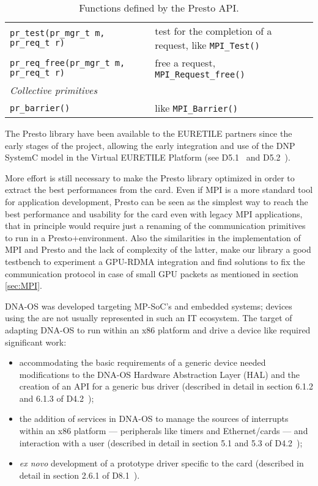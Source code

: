\begin{table}[!htb]
\begin{tabular}{|p{10cm}|p{8cm}|}
\texttt{pr\_test(pr\_mgr\_t \*m, pr\_req\_t r)} & test for the completion of a request, like \texttt{MPI\_Test()}\\
\texttt{pr\_req\_free(pr\_mgr\_t \*m, pr\_req\_t r)} & free a request, \texttt{MPI\_Request\_free()}\\
\hline
\hline
\multicolumn{2}{|l|}{\emph{Collective primitives}}\\
\hline
\texttt{pr\_barrier()} & like \texttt{MPI\_Barrier()}\\
\hline       
\end{tabular}
\caption{Functions defined by the Presto API.}
\label{tab:prestoapi}
\end{table}


The Presto library have been available to the EURETILE partners since
the early stages of the project, allowing the early integration and
use of the DNP SystemC model in the Virtual EURETILE Platform (see
D5.1~\cite{euretile:D5_1} and D5.2~\cite{euretile:D5_2}).

More effort is still necessary to make the Presto library optimized in
order to extract the best performances from the \apenetp card.  Even
if MPI is a more standard tool for application development, Presto can
be seen as the simplest way to reach the best performance and
usability for the \apenetp card even with legacy MPI applications,
that in principle would require just a renaming of the communication
primitives to run in a Presto+\apenetp environment. Also the
similarities in the implementation of MPI and Presto and the lack of
complexity of the latter, make our library a good testbench to
experiment a GPU-RDMA integration and find solutions to fix the
communication protocol in case of small GPU packets as mentioned in
section \ref{sec:MPI}.

DNA-OS was developed targeting
MP-SoC's and embedded systems; devices using the \PCIe are not usually
represented in such an IT ecosystem.
The target of adapting DNA-OS to run within an x86 platform and drive
a \PCIe device like \apenetp required significant work:
\begin{itemize}
\item accommodating the basic requirements of a generic \PCIe device
  needed modifications to the DNA-OS Hardware Abstraction Layer (HAL)
  and the creation of an API for a generic bus driver (described in
  detail in section 6.1.2 and 6.1.3 of D4.2~\cite{euretile:D4_2});
\item the addition of services in DNA-OS to manage the sources of
  interrupts within an x86 platform --- peripherals like timers and
  Ethernet/\apenetp cards --- and interaction with a user (described
  in detail in section 5.1 and 5.3 of D4.2~\cite{euretile:D4_2});
\item \textit{ex novo} development of a prototype driver specific to
  the \apenetp card (described in detail in section 2.6.1 of D8.1~\cite{euretile:D8_1}).
\end{itemize}

